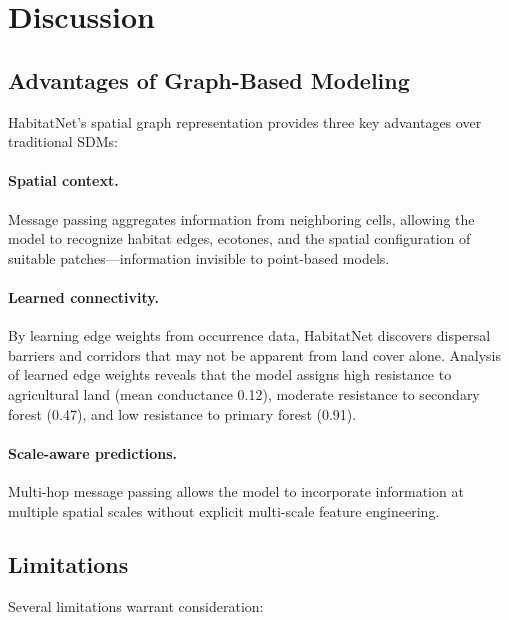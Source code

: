 \documentclass[11pt,a4paper]{article}
\begin{document}
\section{Discussion}
\label{sec:discussion}

\subsection{Advantages of Graph-Based Modeling}

HabitatNet's spatial graph representation provides three key advantages
over traditional SDMs:

\paragraph{Spatial context.} Message passing aggregates information from
neighboring cells, allowing the model to recognize habitat edges,
ecotones, and the spatial configuration of suitable patches---information
invisible to point-based models.

\paragraph{Learned connectivity.} By learning edge weights from
occurrence data, HabitatNet discovers dispersal barriers and corridors
that may not be apparent from land cover alone. Analysis of learned edge
weights reveals that the model assigns high resistance to agricultural
land (mean conductance 0.12), moderate resistance to secondary forest
(0.47), and low resistance to primary forest (0.91).

\paragraph{Scale-aware predictions.} Multi-hop message passing allows
the model to incorporate information at multiple spatial scales without
explicit multi-scale feature engineering.

\subsection{Limitations}

Several limitations warrant consideration:
\end{document}
